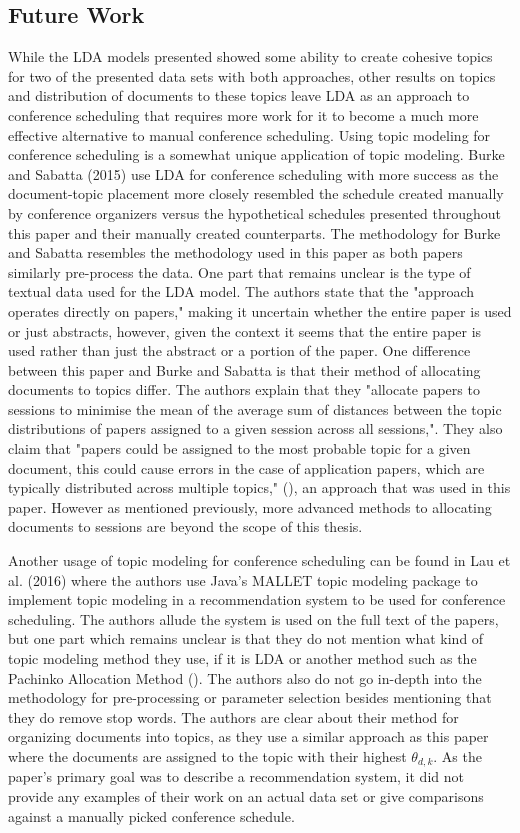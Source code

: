\documentclass[a4paper, 12pt, twoside]{article}
\numberwithin{equation}{section} %
\begin{document}
\subsection{Future Work}

While the LDA models presented showed some ability to create cohesive topics for two of the presented data sets with both approaches, other results on topics and distribution of documents to these topics leave LDA as an approach to conference scheduling that requires more work for it to become a much more effective alternative to manual conference scheduling. Using topic modeling for conference scheduling is a somewhat unique application of topic modeling. Burke and Sabatta (2015) use LDA for conference scheduling with more success as the document-topic placement more closely resembled the schedule created manually by conference organizers versus the hypothetical schedules presented throughout this paper and their manually created counterparts. The methodology for Burke and Sabatta resembles the methodology used in this paper as both papers similarly pre-process the data. One part that remains unclear is the type of textual data used for the LDA model. The authors state that the "approach operates directly on papers," making it uncertain whether the entire paper is used or just abstracts, however, given the context it seems that the entire paper is used rather than just the abstract or a portion of the paper. One difference between this paper and Burke and Sabatta is that their method of allocating documents to topics differ. The authors explain that they "allocate papers to sessions to minimise the mean of the average sum of distances between the topic distributions of papers assigned to a given session across all sessions,". They also claim that "papers could be assigned to the most probable topic for a given document, this could cause errors in the case of application papers, which are typically distributed across multiple topics," (\cite{burke2015}), an approach that was used in this paper. However as mentioned previously, more advanced methods to allocating documents to sessions are beyond the scope of this thesis. 

Another usage of topic modeling for conference scheduling can be found in Lau et al. (2016) where the authors use Java's MALLET topic modeling package to implement topic modeling in a recommendation system to be used for conference scheduling. The authors allude the system is used on the full text of the papers, but one part which remains unclear is that they do not mention what kind of topic modeling method they use, if it is LDA or another method such as the Pachinko Allocation Method (\cite{Li2006}). The authors also do not go in-depth into the methodology for pre-processing or parameter selection besides mentioning that they do remove stop words. The authors are clear about their method for organizing documents into topics, as they use a similar approach as this paper where the documents are assigned to the topic with their highest $\theta_{d,k}$. As the paper's primary goal was to describe a recommendation system, it did not provide any examples of their work on an actual data set or give comparisons against a manually picked conference schedule.
\end{document}
